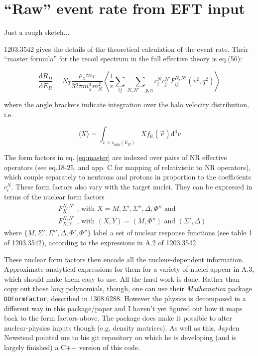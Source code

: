 \documentclass[a4paper]{article}	%
\begin{document}
\section{``Raw'' event rate from EFT input}

Just a rough sketch...

1203.3542\cite{Fitzpatrick2012a} gives the details of the theoretical calculation of the event rate. Their ``master formula'' for the recoil spectrum in the full effective theory is eq.(56):

\begin{equation}
 \frac{\mathrm{d}R_D}{\mathrm{d}E_R} = N_T\frac{\rho_\chi m_T}{32\pi m_\chi^3 m_N^2} \left\langle \frac{1}{v}\sum_{ij}\sum_{N,N'=p,n} c_i^N c_j^{N'} F_{ij}^{N,N'}\left(v^2,q^2\right) \right\rangle 
 \label{eq:master}
\end{equation}

where the angle brackets indicate integration over the halo velocity distribution, i.e. 

\begin{equation}
 \langle X\rangle=\int_{v>v_\text{min}(E_R)} \! X f_\mathrm{E}(\vec{v})\mathrm{d}^3 v
\end{equation}

The form factors in eq. \ref{eq:master} are indexed over pairs of NR effective operators (see eq.18-25, and app. C for mapping of relativistic to NR operators), which couple separately to neutrons and protons in proportion to the coefficients $c_i^{N}$. These form factors also vary with the target nuclei. They can be expressed in terms of the nuclear form factors 
%
\begin{align}
   &F_X^{N,N'}\text{ ,   with  } X = M,\Sigma',\Sigma'',\Delta,\Phi'' \text{    and} \\
   &F_{X,Y}^{N,N'}\text{ ,   with  } (X,Y) = (M,\Phi'')\text{ and }(\Sigma',\Delta)
\end{align}
%
where $\{M,\Sigma',\Sigma'',\Delta,\Phi',\Phi''\}$ label a set of nuclear response functions (see table 1 of 1203.3542\cite{Fitzpatrick2012a}), according to the expressions in A.2 of 1203.3542\cite{Fitzpatrick2012a}.

These nuclear form factors then encode all the nucleus-dependent information. Approximate analytical expressions for them for a variety of nuclei appear in A.3, which should make them easy to use. All the hard work is done. Rather than copy out those long polynomials, though, one can use their \textit{Mathematica} package \texttt{DDFormFactor}, described in 1308.6288\cite{Anand2014b}. However the physics is decomposed in a different way in this package/paper and I haven't yet figured out how it maps back to the form factors above. The package does make it possible to alter nuclear-physics inputs though (e.g. density matrices). As well as this, Jayden Newstead pointed me to his git repository on which he is developing (and is largely finished) a C++ version of this code.
\end{document}
